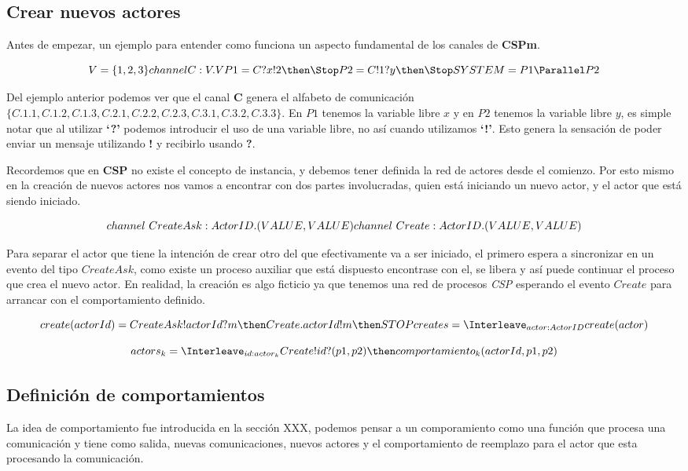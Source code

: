 \documentclass[fleqn]{article}
\begin{document}
\subsection{Crear nuevos actores}

Antes de empezar, un ejemplo para entender como funciona un aspecto fundamental
de los canales de \textbf{CSPm}. 

\[
V = \{1,2,3\} \\
channel C:V.V \\
P1 = C?x!2 \then \Stop \\
P2 = C!1?y \then \Stop \\
SYSTEM = P1 \Parallel P2
\]

Del ejemplo anterior podemos ver que el canal \textbf{C} genera el alfabeto de
comunicación $\{ C.1.1, C.1.2, C.1.3, C.2.1, C.2.2, C.2.3, C.3.1, C.3.2, C.3.3 \}$.
En $P1$ tenemos la variable libre $x$ y en $P2$ tenemos la variable libre $y$,
es simple notar que al utilizar \textbf{`?'} podemos introducir el uso de una
variable libre, no así cuando utilizamos \textbf{`!'}.
Esto genera la sensación de poder enviar un mensaje utilizando \textbf{!} y
recibirlo usando \textbf{?}.

Recordemos que en \textbf{CSP} no existe el concepto de instancia, y debemos
tener definida la red de actores desde el comienzo.
Por esto mismo en la creación de nuevos actores nos vamos a encontrar con dos
partes involucradas, quien está iniciando un nuevo actor, y el actor que está
siendo iniciado.

\[
channel\ CreateAsk:ActorID.(VALUE, VALUE)\\
channel\ Create:ActorID.(VALUE, VALUE)
\]

Para separar el actor que tiene la intención de crear otro del que efectivamente
va a ser iniciado, el primero espera a sincronizar en un evento del tipo
$CreateAsk$, como existe un proceso auxiliar que está dispuesto encontrase con
el, se libera y así puede continuar el proceso que crea el nuevo actor.
En realidad, la creación es algo ficticio ya que tenemos una red de
procesos \textit{CSP} esperando el evento $Create$ para arrancar con el
comportamiento definido.

\[
create(actorId) = CreateAsk!actorId?m \then Create.actorId!m \then STOP
creates = \Interleave_{actor : ActorID} create(actor)
\]

\[
actors_k = \Interleave_{id : actor_k } Create!id?(p1, p2) \then
comportamiento_k(actorId, p1, p2)
\]

\subsection{Definición de comportamientos}
La idea de comportamiento fue introducida en la sección XXX, podemos pensar a un
comporamiento como una función que procesa una comunicación y tiene como salida,
nuevas comunicaciones, nuevos actores y el comportamiento de reemplazo para el
actor que esta procesando la comunicación.
\end{document}
